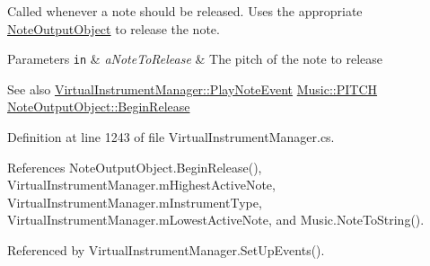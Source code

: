 Called whenever a note should be released. Uses the appropriate \hyperlink{class_note_output_object}{Note\+Output\+Object} to release the note. 


\begin{DoxyParams}[1]{Parameters}
\mbox{\tt in}  & {\em a\+Note\+To\+Release} & The pitch of the note to release\\
\hline
\end{DoxyParams}
\begin{DoxySeeAlso}{See also}
\hyperlink{group___v_i_m_event_types_class_virtual_instrument_manager_1_1_play_note_event}{Virtual\+Instrument\+Manager\+::\+Play\+Note\+Event} \hyperlink{group___music_enums_ga508f69b199ea518f935486c990edac1d}{Music\+::\+P\+I\+T\+CH} \hyperlink{group___n_o_o_pub_func_ga044e62759958d717c7fa4fd1615e2ec1}{Note\+Output\+Object\+::\+Begin\+Release} 
\end{DoxySeeAlso}


Definition at line 1243 of file Virtual\+Instrument\+Manager.\+cs.



References Note\+Output\+Object.\+Begin\+Release(), Virtual\+Instrument\+Manager.\+m\+Highest\+Active\+Note, Virtual\+Instrument\+Manager.\+m\+Instrument\+Type, Virtual\+Instrument\+Manager.\+m\+Lowest\+Active\+Note, and Music.\+Note\+To\+String().



Referenced by Virtual\+Instrument\+Manager.\+Set\+Up\+Events().


